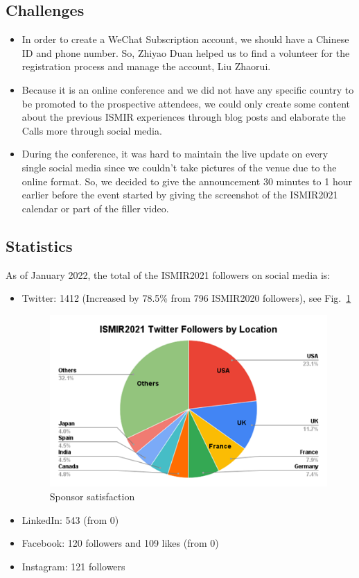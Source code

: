 \documentclass[%
10pt,								%
]
{scrartcl}
\begin{document}
    \subsection{Challenges}
        \begin{itemize}
            \item   In order to create a WeChat Subscription account, we should have a Chinese ID and phone number. So, Zhiyao Duan helped us to find a volunteer for the registration process and manage the account, Liu Zhaorui. 
            \item   Because it is an online conference and we did not have any specific country to be promoted to the prospective attendees, we could only create some content about the previous ISMIR experiences through blog posts and elaborate the Calls more through social media.
            \item   During the conference, it was hard to maintain the live update on every single social media since we couldn’t take pictures of the venue due to the online format. So, we decided to give the announcement 30 minutes to 1 hour earlier before the event started by giving the screenshot of the ISMIR2021 calendar or part of the filler video.
        \end{itemize}
        
    \subsection{Statistics}
        As of January 2022, the total of the ISMIR2021 followers on social media is:
        \begin{itemize}
            \item Twitter: 1412 (Increased by 78.5\% from 796 ISMIR2020 followers), see Fig.~\ref{fig:socialmedia_twitter}
                \begin{figure}%
                    \includegraphics[width=\columnwidth]{fig/socialmedia_twitter}%
                    \caption{Sponsor satisfaction}%
                    \label{fig:socialmedia_twitter}%
                \end{figure}
            \item   LinkedIn: 543  (from 0)
            \item   Facebook: 120 followers and 109 likes (from 0)
            \item   Instagram: 121 followers
        \end{itemize}
        
\end{document}
